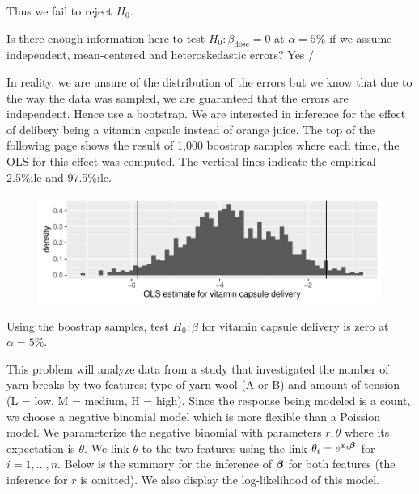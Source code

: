 \documentclass[12pt]{article}
\begin{document}
\begin{enumerate}[(a)]
{Thus we fail to reject $H_0$.
}


 Is there enough information here to test $H_0: \beta_{\text{dose}} = 0$ at $\alpha = 5\%$ if we assume independent, mean-centered and heteroskedastic errors? Yes /  

In reality, we are unsure of the distribution of the errors but we know that due to the way the data was sampled, we are guaranteed that the errors are independent. Hence use a bootstrap. We are interested in inference for the effect of delibery being a vitamin capsule instead of orange juice. The top of the following page shows the result of 1,000 boostrap samples where each time, the OLS for this effect was computed. The vertical lines indicate the empirical 2.5\%ile and 97.5\%ile.
\pagebreak 

\begin{figure}[htp]
\centering
\includegraphics[width=6.5in]{bootstrap}
\end{figure}
\FloatBarrier


 Using the boostrap samples, test $H_0: \beta$ for vitamin capsule delivery is zero at $\alpha = 5\%$. \\



\end{enumerate}

\problem This problem will analyze data from a study that investigated the number of yarn breaks by two features: type of yarn wool (A or B) and amount of tension (L = low, M = medium, H = high). Since the response being modeled is a count, we choose a negative binomial model which is more flexible than a Poission model. We parameterize the negative binomial with parameters $r, \theta$ where its expectation is $\theta$. We link $\theta$ to the two features using the link $\theta_i = e^{\boldsymbol{x}_i \boldsymbol{\beta}}$ for $i = 1, \ldots, n$. Below is the summary for the inference of $\boldsymbol{\beta}$ for both features (the inference for $r$ is omitted). We also display the log-likelihood of this model.
\end{document}
